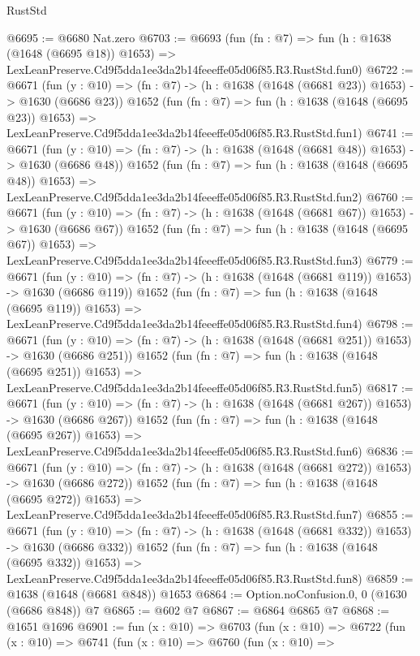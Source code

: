 \begin{lexlean}{RustStd}
\begin{coremodule}
@6695 := @6680 Nat.zero
@6703 := @6693
    (fun (fn : @7) =>
    fun (h : @1638 (@1648 (@6695 @18)) @1653) =>
    LexLeanPreserve.Cd9f5dda1ee3da2b14feeeffe05d06f85.R3.RustStd.fun0)
@6722 := @6671
    (fun (y : @10) => (fn : @7) -> (h : @1638 (@1648 (@6681 @23)) @1653) -> @1630 (@6686 @23))
    @1652
    (fun (fn : @7) =>
    fun (h : @1638 (@1648 (@6695 @23)) @1653) =>
    LexLeanPreserve.Cd9f5dda1ee3da2b14feeeffe05d06f85.R3.RustStd.fun1)
@6741 := @6671
    (fun (y : @10) => (fn : @7) -> (h : @1638 (@1648 (@6681 @48)) @1653) -> @1630 (@6686 @48))
    @1652
    (fun (fn : @7) =>
    fun (h : @1638 (@1648 (@6695 @48)) @1653) =>
    LexLeanPreserve.Cd9f5dda1ee3da2b14feeeffe05d06f85.R3.RustStd.fun2)
@6760 := @6671
    (fun (y : @10) => (fn : @7) -> (h : @1638 (@1648 (@6681 @67)) @1653) -> @1630 (@6686 @67))
    @1652
    (fun (fn : @7) =>
    fun (h : @1638 (@1648 (@6695 @67)) @1653) =>
    LexLeanPreserve.Cd9f5dda1ee3da2b14feeeffe05d06f85.R3.RustStd.fun3)
@6779 := @6671
    (fun (y : @10) => (fn : @7) -> (h : @1638 (@1648 (@6681 @119)) @1653) -> @1630 (@6686 @119))
    @1652
    (fun (fn : @7) =>
    fun (h : @1638 (@1648 (@6695 @119)) @1653) =>
    LexLeanPreserve.Cd9f5dda1ee3da2b14feeeffe05d06f85.R3.RustStd.fun4)
@6798 := @6671
    (fun (y : @10) => (fn : @7) -> (h : @1638 (@1648 (@6681 @251)) @1653) -> @1630 (@6686 @251))
    @1652
    (fun (fn : @7) =>
    fun (h : @1638 (@1648 (@6695 @251)) @1653) =>
    LexLeanPreserve.Cd9f5dda1ee3da2b14feeeffe05d06f85.R3.RustStd.fun5)
@6817 := @6671
    (fun (y : @10) => (fn : @7) -> (h : @1638 (@1648 (@6681 @267)) @1653) -> @1630 (@6686 @267))
    @1652
    (fun (fn : @7) =>
    fun (h : @1638 (@1648 (@6695 @267)) @1653) =>
    LexLeanPreserve.Cd9f5dda1ee3da2b14feeeffe05d06f85.R3.RustStd.fun6)
@6836 := @6671
    (fun (y : @10) => (fn : @7) -> (h : @1638 (@1648 (@6681 @272)) @1653) -> @1630 (@6686 @272))
    @1652
    (fun (fn : @7) =>
    fun (h : @1638 (@1648 (@6695 @272)) @1653) =>
    LexLeanPreserve.Cd9f5dda1ee3da2b14feeeffe05d06f85.R3.RustStd.fun7)
@6855 := @6671
    (fun (y : @10) => (fn : @7) -> (h : @1638 (@1648 (@6681 @332)) @1653) -> @1630 (@6686 @332))
    @1652
    (fun (fn : @7) =>
    fun (h : @1638 (@1648 (@6695 @332)) @1653) =>
    LexLeanPreserve.Cd9f5dda1ee3da2b14feeeffe05d06f85.R3.RustStd.fun8)
@6859 := @1638 (@1648 (@6681 @848)) @1653
@6864 := Option.noConfusion.{0, 0} (@1630 (@6686 @848)) @7
@6865 := @602 @7
@6867 := @6864 @6865 @7
@6868 := @1651 @1696
@6901 := fun (x : @10) =>
  @6703
    (fun (x : @10) =>
    @6722
      (fun (x : @10) =>
      @6741
        (fun (x : @10) =>
        @6760
          (fun (x : @10) =>

\end{coremodule}
\end{lexlean}
